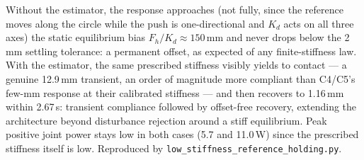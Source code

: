 \documentclass[journal]{IEEEtran}
\begin{document}
Without the estimator, the response approaches (not fully, since the
reference moves along the circle while the push is one-directional and
$K_d$ acts on all three axes) the static equilibrium bias
$F_h/K_d\approx150$\,mm and never drops below the 2\,mm settling
tolerance: a permanent offset, as expected of any finite-stiffness law.
With the estimator, the same prescribed stiffness visibly yields to
contact --- a genuine 12.9\,mm transient, an order of magnitude more
compliant than C4/C5's few-mm response at their calibrated stiffness ---
and then recovers to 1.16\,mm within 2.67\,s: transient compliance
followed by offset-free recovery, extending the architecture beyond
disturbance rejection around a stiff equilibrium. Peak positive joint power stays low in both cases (5.7
and 11.0\,W) since the prescribed stiffness itself is low. Reproduced by
\texttt{low\_stiffness\_reference\_holding.py}.



\end{document}
